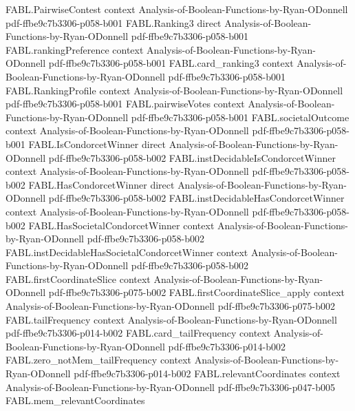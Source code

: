 \begin{theorem}
\proofstep
  {FABL.PairwiseContest}
  {context}
  {Analysis-of-Boolean-Functions-by-Ryan-ODonnell}
  {pdf-ffbe9c7b3306-p058-b001}
\proofstep
  {FABL.Ranking3}
  {direct}
  {Analysis-of-Boolean-Functions-by-Ryan-ODonnell}
  {pdf-ffbe9c7b3306-p058-b001}
\proofstep
  {FABL.rankingPreference}
  {context}
  {Analysis-of-Boolean-Functions-by-Ryan-ODonnell}
  {pdf-ffbe9c7b3306-p058-b001}
\proofstep
  {FABL.card_ranking3}
  {context}
  {Analysis-of-Boolean-Functions-by-Ryan-ODonnell}
  {pdf-ffbe9c7b3306-p058-b001}
\proofstep
  {FABL.RankingProfile}
  {context}
  {Analysis-of-Boolean-Functions-by-Ryan-ODonnell}
  {pdf-ffbe9c7b3306-p058-b001}
\proofstep
  {FABL.pairwiseVotes}
  {context}
  {Analysis-of-Boolean-Functions-by-Ryan-ODonnell}
  {pdf-ffbe9c7b3306-p058-b001}
\proofstep
  {FABL.societalOutcome}
  {context}
  {Analysis-of-Boolean-Functions-by-Ryan-ODonnell}
  {pdf-ffbe9c7b3306-p058-b001}
\proofstep
  {FABL.IsCondorcetWinner}
  {direct}
  {Analysis-of-Boolean-Functions-by-Ryan-ODonnell}
  {pdf-ffbe9c7b3306-p058-b002}
\proofstep
  {FABL.instDecidableIsCondorcetWinner}
  {context}
  {Analysis-of-Boolean-Functions-by-Ryan-ODonnell}
  {pdf-ffbe9c7b3306-p058-b002}
\proofstep
  {FABL.HasCondorcetWinner}
  {direct}
  {Analysis-of-Boolean-Functions-by-Ryan-ODonnell}
  {pdf-ffbe9c7b3306-p058-b002}
\proofstep
  {FABL.instDecidableHasCondorcetWinner}
  {context}
  {Analysis-of-Boolean-Functions-by-Ryan-ODonnell}
  {pdf-ffbe9c7b3306-p058-b002}
\proofstep
  {FABL.HasSocietalCondorcetWinner}
  {context}
  {Analysis-of-Boolean-Functions-by-Ryan-ODonnell}
  {pdf-ffbe9c7b3306-p058-b002}
\proofstep
  {FABL.instDecidableHasSocietalCondorcetWinner}
  {context}
  {Analysis-of-Boolean-Functions-by-Ryan-ODonnell}
  {pdf-ffbe9c7b3306-p058-b002}
\proofstep
  {FABL.firstCoordinateSlice}
  {context}
  {Analysis-of-Boolean-Functions-by-Ryan-ODonnell}
  {pdf-ffbe9c7b3306-p075-b002}
\proofstep
  {FABL.firstCoordinateSlice_apply}
  {context}
  {Analysis-of-Boolean-Functions-by-Ryan-ODonnell}
  {pdf-ffbe9c7b3306-p075-b002}
\proofstep
  {FABL.tailFrequency}
  {context}
  {Analysis-of-Boolean-Functions-by-Ryan-ODonnell}
  {pdf-ffbe9c7b3306-p014-b002}
\proofstep
  {FABL.card_tailFrequency}
  {context}
  {Analysis-of-Boolean-Functions-by-Ryan-ODonnell}
  {pdf-ffbe9c7b3306-p014-b002}
\proofstep
  {FABL.zero_notMem_tailFrequency}
  {context}
  {Analysis-of-Boolean-Functions-by-Ryan-ODonnell}
  {pdf-ffbe9c7b3306-p014-b002}
\proofstep
  {FABL.relevantCoordinates}
  {context}
  {Analysis-of-Boolean-Functions-by-Ryan-ODonnell}
  {pdf-ffbe9c7b3306-p047-b005}
\proofstep
  {FABL.mem_relevantCoordinates}

\end{theorem}
